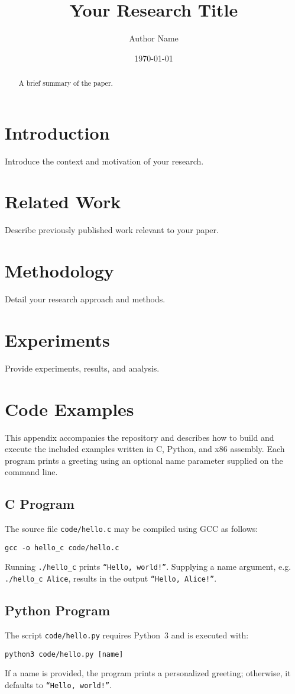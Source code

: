 \documentclass{article}
\title{Your Research Title}
\author{Author Name}
\date{\today}
\begin{document}
\maketitle

\begin{abstract}
A brief summary of the paper.
\end{abstract}

\section{Introduction}
Introduce the context and motivation of your research.

\section{Related Work}
Describe previously published work relevant to your paper.

\section{Methodology}
Detail your research approach and methods.

\section{Experiments}
Provide experiments, results, and analysis.

\section{Code Examples}
This appendix accompanies the repository and describes how to build and
execute the included examples written in C, Python, and x86
assembly. Each program prints a greeting using an optional name
parameter supplied on the command line.

\subsection{C Program}
The source file \verb|code/hello.c| may be compiled using GCC as
follows:
\begin{verbatim}
gcc -o hello_c code/hello.c
\end{verbatim}
Running \verb|./hello_c| prints \texttt{``Hello, world!''}. Supplying a
name argument, e.g. \verb|./hello_c Alice|, results in the output
\texttt{``Hello, Alice!''}.

\subsection{Python Program}
The script \verb|code/hello.py| requires Python~3 and is executed with:
\begin{verbatim}
python3 code/hello.py [name]
\end{verbatim}
If a name is provided, the program prints a personalized greeting; otherwise,
it defaults to \texttt{``Hello, world!''}.
\end{document}
